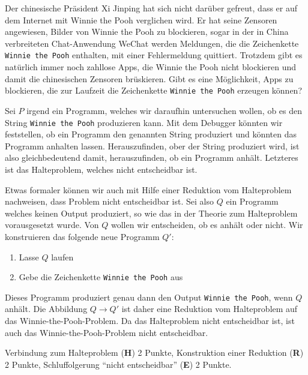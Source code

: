 Der chinesische Präsident Xi Jinping hat sich nicht darüber gefreut, dass
er auf dem Internet mit Winnie the Pooh verglichen wird.
Er hat seine
Zensoren angewiesen, Bilder von Winnie the Pooh zu blockieren, sogar in
der in China verbreiteten Chat-Anwendung WeChat werden Meldungen, die
die Zeichenkette {\tt 
Winnie the Pooh} enthalten, mit einer Fehlermeldung quittiert. 
Trotzdem gibt es natürlich immer noch zahllose Apps, die Winnie the Pooh
nicht blockieren und damit die chinesischen Zensoren brüskieren.
Gibt es eine Möglichkeit, Apps zu blockieren, die zur Laufzeit die
Zeichenkette \texttt{Winnie the Pooh} erzeugen können?


\begin{loesung}
Sei $P$ irgend ein Programm, welches wir daraufhin untersuchen
wollen, ob es den String {\tt Winnie the Pooh} produzieren kann.
Mit dem Debugger könnten wir feststellen, ob ein Programm den
genannten String produziert und könnten das Programm anhalten lassen.
Herauszufinden, ober der String produziert wird, ist also gleichbedeutend
damit, herauszufinden, ob ein Programm anhält.
Letzteres ist das Halteproblem, welches nicht entscheidbar ist.

Etwas formaler können wir auch mit Hilfe einer Reduktion vom Halteproblem
nachweisen, dass Problem nicht entscheidbar ist.
Sei also $Q$ ein Programm welches keinen Output produziert, so wie das
in der Theorie zum Halteproblem vorausgesetzt wurde.
Von $Q$ wollen wir entscheiden, ob es anhält oder nicht.
Wir konstruieren das folgende neue Programm $Q'$:
\begin{enumerate}
\item Lasse $Q$ laufen
\item Gebe die Zeichenkette {\tt Winnie the Pooh} aus
\end{enumerate}
Dieses Programm produziert genau dann den Output {\tt Winnie the Pooh},
wenn $Q$ anhält.
Die Abbildung $Q\to Q'$ ist daher eine Reduktion vom Halteproblem auf
das Winnie-the-Pooh-Problem.
Da das Halteproblem nicht entscheidbar ist, ist auch das
Winnie-the-Pooh-Problem nicht entscheidbar.
\end{loesung}

\begin{bewertung}
Verbindung zum Halteproblem ({\bf H}) 2 Punkte,
Konstruktion einer Reduktion ({\bf R}) 2 Punkte,
Schluffolgerung ``nicht entscheidbar'' ({\bf E}) 2 Punkte.
\end{bewertung}


